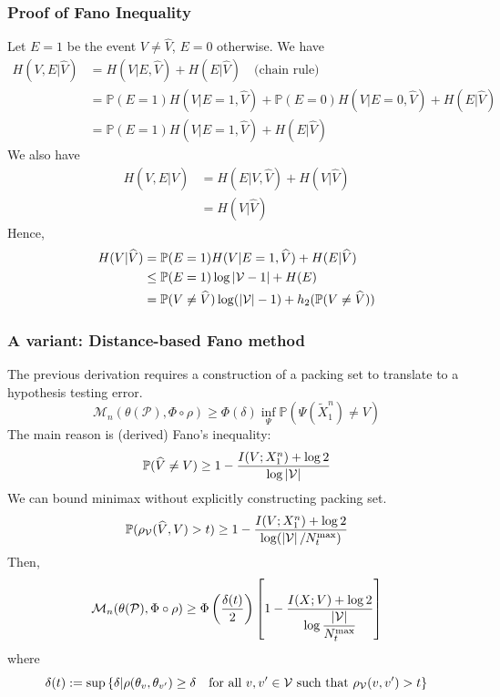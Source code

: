 \documentclass[10pt,xcolor={usenames,dvipsnames,table},aspectratio=169]{beamer}
\begin{document}
\begin{frame}
    \frametitle{Proof of Fano Inequality}
    Let $E=1$ be the event  $V \neq \widehat{V}$, $E=0$ otherwise.
    We have
    \begin{align*}
        H(V, E|\widehat{V}) 
        &= H(V| E, \widehat{V}) + H(E |\widehat{V}) \quad \text{(chain rule)} \\
        &= \mathbb{P}(E=1) H(V| E=1, \widehat{V}) + \mathbb{P}(E=0)  H(V|E=0, \widehat{V}) + H(E| \widehat{V}) \\
        &= \mathbb{P}(E=1) H(V|E=1, \widehat{V}) + H(E|\widehat{V})
    \end{align*}
    We also have
    \begin{align*}
        H(V, E|\widehat{V}) 
        &= H(E|V, \widehat{V}) + H(V|\widehat{V}) \\
        &= H(V|\widehat{V})
    \end{align*}
    Hence,
    \begin{align*}
    H(V|\widehat{V}) 
    &= \mathbb{P}(E=1) H(V|E=1, \widehat{V}) + H(E|\widehat{V}) \\
    &\leq \mathbb{P}(E=1) \log \left\lvert\mathcal{V}-1\right\rvert + H(E) \\
    &= \mathbb{P}(V \neq \widehat{V}) \log (\left\lvert\mathcal{V}\right\rvert-1) + h_2( \mathbb{P}(V \neq \widehat{V})) \\
    \end{align*}
    
\end{frame}

\begin{frame}
    \frametitle{A variant: Distance-based Fano method}
    The previous derivation requires a construction of a packing set to translate to a hypothesis testing error.
    \[
        \mathcal{M}_n(\theta(\mathcal{P}), \Phi \circ \rho) \geq \Phi(\delta) \inf_{\Psi} \mathbb{P}(\Psi(\widetilde{X}_1^{n}) \neq V)
    \] 
    The main reason is (derived) Fano's inequality:
    \[
    \mathbb{P}(\widehat{V} \neq V) \geq 1 - \dfrac{I(V; X_1^{n}) + \log 2}{ \log \left\lvert\mathcal{V}\right\rvert}
    \] 
    We can bound minimax without explicitly constructing packing set.
    \[
    \mathbb{P}(\rho_{\mathcal{V}}(\widehat{V}, V) > t) \geq 1 - \dfrac{I(V;X_1^{n}) + \log 2}{\log (\left\lvert\mathcal{V}\right\rvert/N_t^{\max})}
    \] 
    Then,
    \[
    \mathcal{M}_n(\theta(\mathcal{P}), \Phi \circ \rho) \geq \Phi \left( \dfrac{\delta(t)}{2} \right) \left[ 1-\dfrac{I(X; V) + \log 2}{\log \dfrac{\left\lvert\mathcal{V}\right\rvert}{N_t^{\max}}} \right]
    \] 
    where 
            \[
            \delta(t) := \sup \left\{\delta | \rho(\theta_v, \theta_{v'}) \geq \delta \quad \text{for all } v, v'\in \mathcal{V} \text{ such that } \rho_{\mathcal{V}}(v, v') > t\right\}
            \] 
\end{frame}
\end{document}
